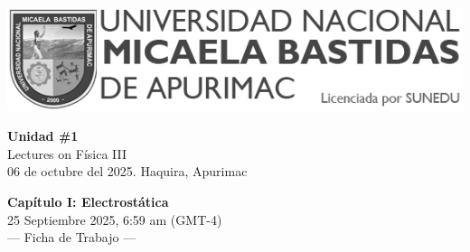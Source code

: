 


\begin{minipage}[l]{0.42\textwidth}
    \includegraphics[width=1\textwidth]{img/logo-UNAMBA.png}
\end{minipage}
\hfill
\begin{minipage}[c]{0.5\textwidth}
    \begin{flushright}
	\large{\textbf{Unidad \#1}}\\
	\large{Lectures on Física III}\\
	\large{06 de octubre del 2025. Haquira, Apurimac}\\
    \end{flushright}
\end{minipage}


  
 \begin{multicols}{3}
    \begin{center}
         \LARGE{\textbf{Capítulo I: Electrostática}}\\	
         \vspace{1.2cm}
         \large{25 Septiembre 2025, 6:59 am (GMT-4)}\\
         \large{— Ficha de Trabajo —}
    \end{center}
    
    
    
   


\end{multicols}
